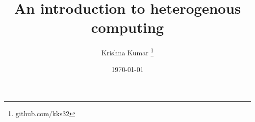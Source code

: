 \usepackage{amsfonts}
\usepackage{amsmath}
\usepackage{amssymb}
\usepackage{mathptmx}

\usepackage{color}
\usepackage{minted}
\usepackage{hyperref}
\usepackage{multicol}
\usepackage{multirow}
\usepackage{tabularx}
\usepackage{booktabs}
\usepackage{menukeys}
\usepackage{subcaption}

{
}


\usepackage{caption}
\captionsetup{font=scriptsize, labelfont=scriptsize, justification=centering}

\title{An introduction to heterogenous computing}

\author {Krishna Kumar \inst{*}\thanks{github.com/kks32} }



\date[\today]{\today}



